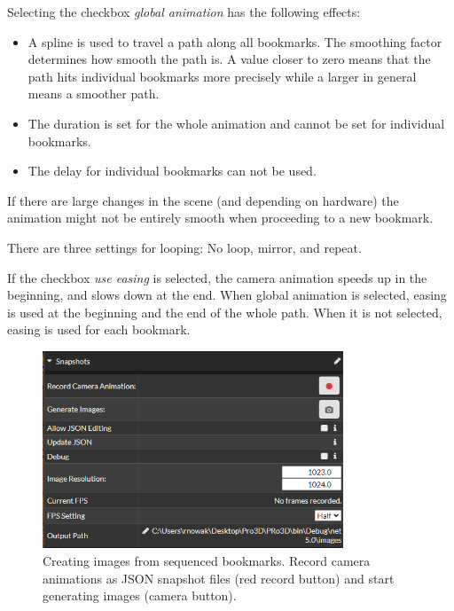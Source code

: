 Selecting the checkbox \emph{global animation} has the following effects: 

\begin{itemize}
	\item A spline is used to travel a path along all bookmarks. The smoothing factor determines how smooth the path is. A value closer to zero means that the path hits individual bookmarks more precisely while a larger in general means a smoother path.
	\item The duration is set for the whole animation and cannot be set for individual bookmarks.
	\item The delay for individual bookmarks can not be used.
\end{itemize}

If there are large changes in the scene (and depending on hardware) the animation might not be entirely smooth when proceeding to a new bookmark.

There are three settings for looping: No loop, mirror, and repeat.

If the checkbox \emph{use easing} is selected, the camera animation speeds up in the beginning, and slows down at the end. When global animation is selected, easing is used at the beginning and the end of the whole path. When it is not selected, easing is used for each bookmark.




\begin{figure}[h]
	\centering
	\includegraphics[width=0.8\textwidth]{pics/SequencedBookmarks_tabSnapshots.png}
	\caption[Viewer Features Bookmarks]{Creating images from sequenced bookmarks. Record camera animations as JSON snapshot files (red record button) and start generating images (camera button).}
	\label{fig:SequencedBookmarks_tabSnapshots.PNG}
\end{figure}

